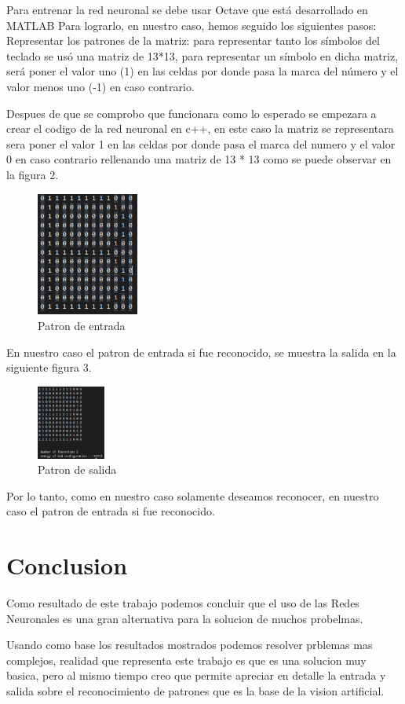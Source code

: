 \documentclass[10pt]{article}         %
\begin{document}
Para entrenar la red neuronal se debe usar Octave que está desarrollado en MATLAB Para lograrlo, en nuestro caso, hemos seguido los siguientes pasos:
Representar los patrones de la matriz: para representar tanto los símbolos del teclado se usó una matriz de 13*13, para representar un símbolo en dicha matriz, será poner el valor uno (1) en las celdas por donde pasa la marca del número y el valor menos uno (-1) en caso contrario.

Despues de que se comprobo que funcionara como lo esperado se empezara a crear el codigo de la red neuronal en c++, en este caso la matriz se representara sera poner el valor 1 en las celdas por donde pasa el marca del numero y el valor 0 en caso contrario rellenando una matriz de 13 * 13 como se puede observar en la figura 2.

\begin{figure}[htb]
\centering
\includegraphics[width=0.3\textwidth]{entrada.png}
\caption{Patron de entrada}
\label{fig:tigre}
\end{figure}

En nuestro caso el patron de entrada si fue reconocido, se muestra la salida en la siguiente figura 3.

\begin{figure}[htb]
\centering
\includegraphics[width=0.2\textwidth]{salida.png}
\caption{Patron de salida}
\label{fig:tigre}
\end{figure}

Por lo tanto, como en nuestro caso solamente deseamos reconocer, en nuestro caso el patron de entrada si fue reconocido.

\section{Conclusion}
 Como resultado de este trabajo podemos concluir que el uso de las Redes Neuronales es una gran alternativa para la solucion de muchos probelmas.

Usando como base los resultados mostrados podemos resolver prblemas mas complejos, realidad que representa este trabajo es que es una solucion muy basica, pero al mismo tiempo creo que permite apreciar en detalle la entrada y salida sobre el reconocimiento de patrones que es la base de la vision artificial.
\end{document}
